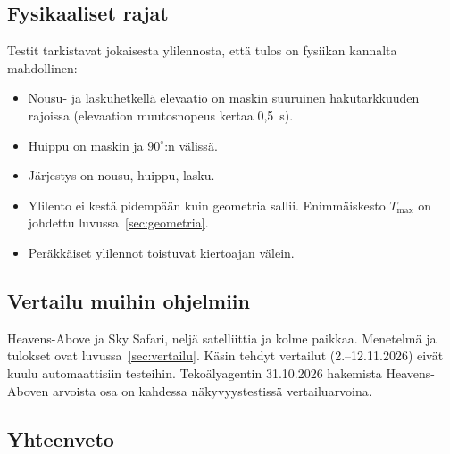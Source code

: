 \documentclass[a4paper,11pt]{article}
\begin{document}
\subsection{Fysikaaliset rajat}
Testit tarkistavat jokaisesta ylilennosta, että tulos on fysiikan kannalta mahdollinen:
\begin{itemize}
  \item Nousu- ja laskuhetkellä elevaatio on maskin suuruinen hakutarkkuuden rajoissa
    (elevaation muutosnopeus kertaa 0,5~s).
  \item Huippu on maskin ja $90^\circ$:n välissä.
  \item Järjestys on nousu, huippu, lasku.
  \item Ylilento ei kestä pidempään kuin geometria sallii. Enimmäiskesto $T_\text{max}$ on
    johdettu luvussa~\ref{sec:geometria}.
  \item Peräkkäiset ylilennot toistuvat kiertoajan välein.
\end{itemize}

\subsection{Vertailu muihin ohjelmiin}
Heavens-Above ja Sky Safari, neljä satelliittia ja kolme paikkaa. Menetelmä ja tulokset
ovat luvussa~\ref{sec:vertailu}. Käsin tehdyt vertailut (2.--12.11.2026) eivät kuulu
automaattisiin testeihin. Tekoälyagentin 31.10.2026 hakemista Heavens-Aboven arvoista osa
on kahdessa näkyvyystestissä vertailuarvoina.

\subsection{Yhteenveto}
\end{document}

